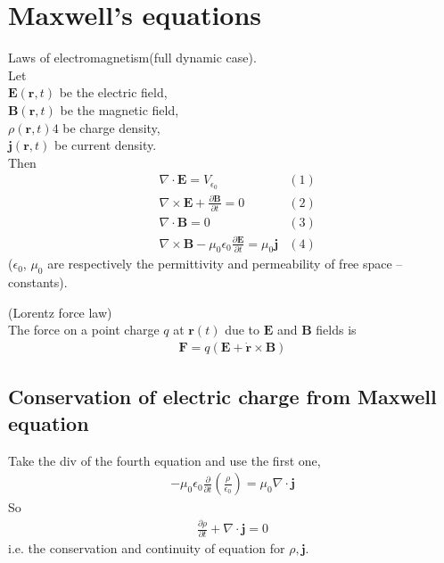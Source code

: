 \documentclass[a4paper]{article}
\begin{document}
\newpage
\section{Maxwell's equations}
Laws of electromagnetism(full dynamic case).\\
Let\\
$\mathbf{E}\left(\mathbf{r},t\right)$ be the electric field,\\
$\mathbf{B}\left(\mathbf{r},t\right)$ be the magnetic field,\\
$\rho\left(\mathbf{r},t\right)4$ be charge density,\\
$\mathbf{j}\left(\mathbf{r},t\right)$ be current density.\\
Then
\begin{equation*}
\begin{aligned}
&\nabla \cdot \mathbf{E} = V_{\epsilon_0} & (1)\\
&\nabla\times\mathbf{E} + \frac{\partial \mathbf{B}}{\partial t} = 0 & (2)\\
&\nabla\cdot \mathbf{B} = 0 & (3)\\
& \nabla\times\mathbf{B}-\mu_0 \epsilon_0 \frac{\partial \mathbf{E}}{\partial t} = \mu_0 \mathbf{j} & (4)
\end{aligned}
\end{equation*}
($\epsilon_0$, $\mu_0$ are respectively the permittivity and permeability of free space -- constants).\\

\begin{thm} (Lorentz force law)\\
The force on a point charge $q$ at $\mathbf{r}\left(t\right)$ due to $\mathbf{E}$ and $\mathbf{B}$ fields is
\begin{equation*}
\begin{aligned}
\mathbf{F} = q\left(\mathbf{E}+\dot{\mathbf{r}}\times\mathbf{B}\right)
\end{aligned}
\end{equation*}
\end{thm}

\subsection{Conservation of electric charge from Maxwell equation}
Take the div of the fourth equation and use the first one,
\begin{equation*}
\begin{aligned}
-\mu_0 \epsilon_0 \frac{\partial}{\partial t}\left(\frac{\rho}{\epsilon_0}\right) = \mu_0 \nabla \cdot \mathbf{j}
\end{aligned}
\end{equation*}
So
\begin{equation*}
\begin{aligned}
\frac{\partial \rho}{\partial t} + \nabla \cdot \mathbf{j} = 0
\end{aligned}
\end{equation*}
i.e. the conservation and continuity of equation for $\rho, \mathbf{j}$.
\end{document}
